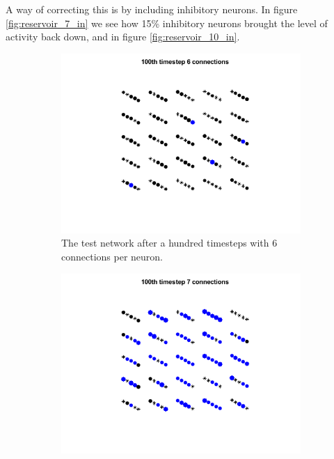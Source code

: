 A way of correcting this is by including inhibitory neurons. In figure \ref{fig:reservoir_7_in} we see how 15\% inhibitory neurons brought the level of activity back down, and in figure \ref{fig:reservoir_10_in}.

\begin{figure}
    \centering
    \begin{subfigure}[b]{0.4\textwidth}
        \includegraphics[width=\textwidth]{Images/pool_6_100.png}
        \caption{The test network after a hundred timesteps with 6 connections per neuron.}
    \label{fig:reservoir_6}
    \end{subfigure}
    \begin{subfigure}[b]{0.4\textwidth}
        \includegraphics[width=\textwidth]{Images/pool_7_100.png}

\end{subfigure}
\end{figure}
